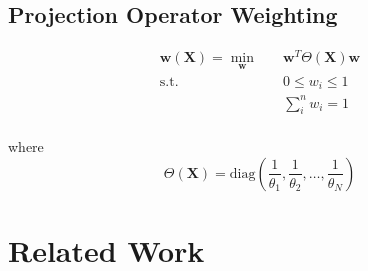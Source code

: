 \documentclass[sigconf]{acmart}
\begin{document}
\subsection{Projection Operator Weighting}
\begin{equation}
\begin{aligned}
\mathbf{w}(\mathbf{X}) = \min_{\mathbf{w}} \quad & \mathbf{w}^T \Theta(\mathbf{X}) \mathbf{w}    \\
\textrm{s.t.} \quad & 0 \leq w_i \leq 1                     \\
                    &   \sum_i^n w_i = 1                      \\
\end{aligned}
\end{equation}

where
\begin{equation}
     \Theta(\mathbf{X}) = \text{diag}\left( \frac{1}{\theta_1},\frac{1}{\theta_2},\dots,\frac{1}{\theta_N}\right)
\end{equation}

\section{Related Work}
\end{document}

